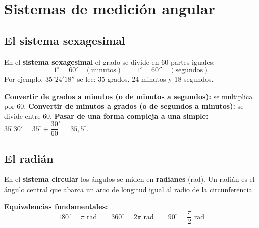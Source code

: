\documentclass[12pt, letterpaper]{article}
\begin{document}
\section{Sistemas de medición angular}

\subsection{El sistema sexagesimal}

\begin{cuadroteoria}
  En el \textbf{sistema sexagesimal} el grado se divide en 60 partes iguales:
  $$1^{\circ} = 60' \quad (\text{minutos}) \qquad 1' = 60'' \quad (\text{segundos})$$
  Por ejemplo, $35^{\circ} 24' 18''$ se lee: 35 grados, 24 minutos y 18 segundos.
\end{cuadroteoria}

\begin{cuadropasos}
  \textbf{Convertir de grados a minutos (o de minutos a segundos):} se multiplica por 60.
  \textbf{Convertir de minutos a grados (o de segundos a minutos):} se divide entre 60.
  \textbf{Pasar de una forma compleja a una simple:} $35^{\circ} 30' = 35^{\circ} + \dfrac{30}{60}^{\circ} = 35{,}5^{\circ}$.
\end{cuadropasos}

\subsection{El radián}

\begin{cuadroteoria}
  En el \textbf{sistema circular} los ángulos se miden en \textbf{radianes} (rad). Un radián es el ángulo central que abarca un arco de longitud igual al radio de la circunferencia.
  \begin{center}
  \end{center}
\end{cuadroteoria}
\begin{cuadroteoria}
  \textbf{Equivalencias fundamentales:}
  $$180^{\circ} = \pi \text{ rad} \qquad 360^{\circ} = 2\pi \text{ rad} \qquad 90^{\circ} = \frac{\pi}{2} \text{ rad}$$
\end{cuadroteoria}
\end{document}
